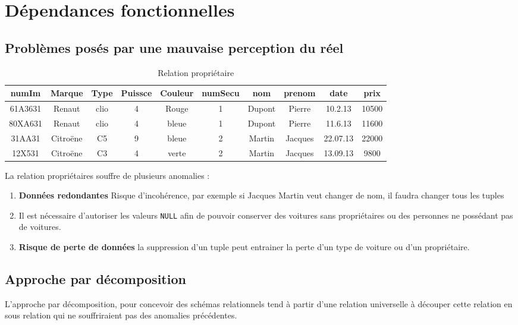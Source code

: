 \documentclass[12pt,a4paper,openany]{book}
\begin{document}
\chapter{Dépendances fonctionnelles}
	\section{Problèmes posés par une mauvaise perception du réel}
		\begin{table}[H]
			\begin{tabular}{cccccccccc}
				\textbf{numIm} & \textbf{Marque} & \textbf{Type} & \textbf{Puissce} & \textbf{Couleur} & \textbf{numSecu} & \textbf{nom} & \textbf{prenom} &
				\textbf{date}  & \textbf{prix}\\
				\hline
				61A3631 &Renaut & clio & 4 & Rouge & 1 & Dupont & Pierre & 10.2.13 & 10500\\
				80XA631 &Renaut & clio & 4 & bleue & 1 & Dupont & Pierre & 11.6.13 & 11600\\
				31AA31 & Citroëne & C5 & 9 & bleue & 2 & Martin & Jacques & 22.07.13 & 22000\\
				12X531 & Citroëne & C3 & 4 & verte & 2 & Martin & Jacques & 13.09.13 & 9800\\
			\end{tabular}
			\caption{Relation propriétaire}
		\end{table}

		La relation propriétaires souffre de plusieurs anomalies : 
		\begin{enumerate}
			\item \textbf{Données redondantes} Risque d'incohérence, par exemple si Jacques Martin veut changer de nom, il faudra changer tous les tuples
			\item Il est nécessaire d'autoriser les valeurs \texttt{NULL} afin de pouvoir conserver des voitures sans propriétaires ou des personnes ne
				possédant pas de voitures.
			\item \textbf{Risque de perte de données} la suppression d'un tuple peut entrainer la perte d'un type de voiture ou d'un propriétaire.
		\end{enumerate}

		\section{Approche par décomposition}
		L'approche par décomposition, pour concevoir des schémas relationnels tend à partir d'une relation universelle à découper cette relation en
		sous relation qui ne souffriraient pas des anomalies précédentes.
\end{document}
